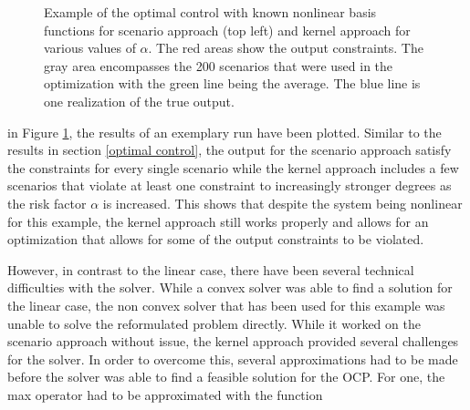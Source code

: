 \begin{figure}[htb]
{		\centering
 } 
\caption{Example of the optimal control with known nonlinear basis functions for scenario approach (top left) and kernel approach for various values of $\alpha$. The red areas show the output constraints. The gray area encompasses the 200 scenarios that were used in the optimization with the green line being the average. The blue line is one realization of the true output.}
\label{ScenarioKernelComparisonNonLinear}
\end{figure}

in Figure \ref{ScenarioKernelComparisonNonLinear}, the results of an exemplary run have been plotted. Similar to the results in section \ref{optimal control}, the output for the scenario approach satisfy the constraints for every single scenario while the kernel approach includes a few scenarios that violate at least one constraint to increasingly stronger degrees as the risk factor $\alpha$ is increased. This shows that despite the system being nonlinear for this example, the kernel approach still works properly and allows for an optimization that allows for some of the output constraints to be violated.

However, in contrast to the linear case, there have been several technical difficulties with the solver. While a convex solver was able to find a solution for the linear case, the non convex solver that has been used for this example was unable to solve the reformulated problem directly. While it worked on the scenario approach without issue, the kernel approach provided several challenges for the solver. In order to overcome this, several approximations had to be made before the solver was able to find a feasible solution for the OCP. For one, the max operator had to be approximated with the function

